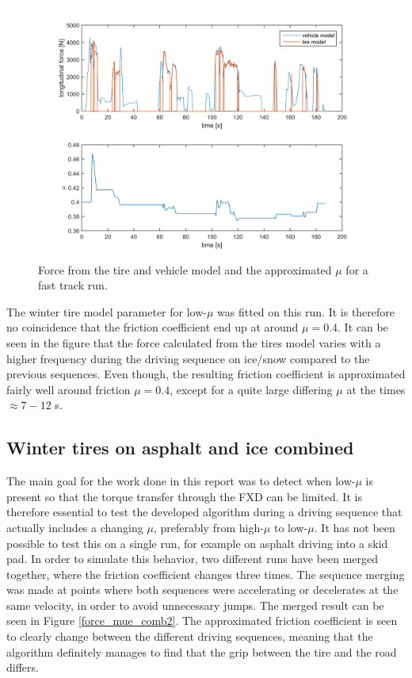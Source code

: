 \begin{figure}[h]
	\centering
	\includegraphics[width=1.0\textwidth]{Pictures/force_mue_ice_normal}
	\caption {Force from the tire and vehicle model and the approximated $ \mu $ for a fast track run.}
	\label{force_mue_ice_normal}
\end{figure}

The winter tire model parameter for low-$ \mu $ was fitted on this run. It is therefore no coincidence that the friction coefficient end up at around $ \mu = 0.4 $. It can be seen in the figure that the force calculated from the tires model varies with a higher frequency during the driving sequence on ice/snow compared to the previous sequences. Even though, the resulting friction coefficient is approximated fairly well around friction $ \mu = 0.4 $, except for a quite large differing $ \mu $ at the times $ \approx 7  - 12$ s.

\subsection{Winter tires on asphalt and ice combined}
The main goal for the work done in this report was to detect when low-$ \mu $ is present so that the torque transfer through the FXD can be limited. It is therefore essential to test the developed algorithm during a driving sequence that actually includes a changing $ \mu $, preferably from high-$ \mu $ to low-$ \mu $. It has not been possible to test this on a single run, for example on asphalt driving into a skid pad. In order to simulate this behavior, two different runs have been merged together, where the friction coefficient changes three times. The sequence merging was made at points where both sequences were accelerating or decelerates at the same velocity, in order to avoid unnecessary jumps. The merged result can be seen in Figure \ref{force_mue_comb2}. The approximated friction coefficient is seen to clearly change between the different driving sequences, meaning that the algorithm definitely manages to find that the grip between the tire and the road differs.
 
